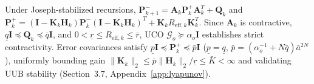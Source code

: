 \documentclass[preprint,12pt]{elsarticle}
\begin{document}
Under Joseph-stabilized recursions, $\mathbf{P}_{k+1}^- = \mathbf{A}_k \mathbf{P}_k^+ \mathbf{A}_k^T + \mathbf{Q}_k$ and $\mathbf{P}_k^+ = (\mathbf{I} - \mathbf{K}_k \mathbf{H}_k)\mathbf{P}_k^-(\mathbf{I} - \mathbf{K}_k \mathbf{H}_k)^T + \mathbf{K}_k R_{\text{eff},k} \mathbf{K}_k^T$. Since $\mathbf{A}_k$ is contractive, $\underline{q}\mathbf{I} \preceq \mathbf{Q}_k \preceq \bar{q}\mathbf{I}$, and $0 < \underline{r} \le R_{\text{eff},k} \le \bar{r}$, UCO $\mathcal{G}_o \succeq \alpha_o \mathbf{I}$ establishes strict contractivity. Error covariances satisfy $\underline{p}\mathbf{I} \preceq \mathbf{P}_k^+ \preceq \bar{p}\mathbf{I}$ ($\underline{p} = \underline{q}$, $\bar{p} = (\alpha_o^{-1} + N\bar{q})\bar{a}^{2N}$), uniformly bounding gain $\|\mathbf{K}_k\|_2 \le \bar{p}\|\mathbf{H}_k\|_2/\underline{r} \le \bar{K} < \infty$ and validating UUB stability (Section~3.7, Appendix~\ref{app:lyapunov}).




\end{document}
